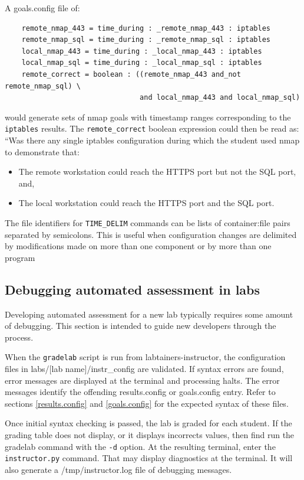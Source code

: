 \documentclass[12pt]{article}
\begin{document}
A goals.config file of:
\begin{verbatim}
    remote_nmap_443 = time_during : _remote_nmap_443 : iptables
    remote_nmap_sql = time_during : _remote_nmap_sql : iptables
    local_nmap_443 = time_during : _local_nmap_443 : iptables
    local_nmap_sql = time_during : _local_nmap_sql : iptables
    remote_correct = boolean : ((remote_nmap_443 and_not remote_nmap_sql) \
                                and local_nmap_443 and local_nmap_sql)
\end{verbatim}
\noindent would generate sets of nmap goals with timestamp ranges corresponding to the
{\tt iptables} results.  The {\tt remote\_correct} boolean expression could then be read as: 
``Was there any
single iptables configuration during which the student used nmap to demonstrate that:
\begin{itemize}
\item The remote workstation could reach the HTTPS port but not the SQL port, and,
\item The local workstation could reach the HTTPS port and the SQL port.
\end{itemize}
The file identifiers for {\tt TIME\_DELIM} commands can be lists of container:file
pairs separated by semicolons.  This is useful when configuration changes are delimited
by modifications made on more than one component or by more than one program



\subsection{Debugging automated assessment in labs}
\label{debug-grading}
Developing automated assessment for a new lab typically requires some
amount of debugging.  This section is intended to guide new developers
through the process.

When the {\tt gradelab} script is run from labtainers-instructor,
the configuration files in labs/[lab name]/instr\_config are validated.
If syntax errors are found, error messages are displayed at the terminal
and processing halts.  The error messages identify the offending results.config
or goals.config entry.  Refer to sections \ref{results.config} and \ref{goals.config} 
for the expected syntax of these files.

Once initial syntax checking is passed, the lab is graded for each student.
If the grading table does not display, or it displays
incorrects values, then find run the gradelab command with the {\tt -d} option.
At the resulting terminal, enter the {\tt instructor.py}
command.  That may display diagnostics at the terminal.  It will also generate
a /tmp/instructor.log file of debugging messages. 
\end{document}

